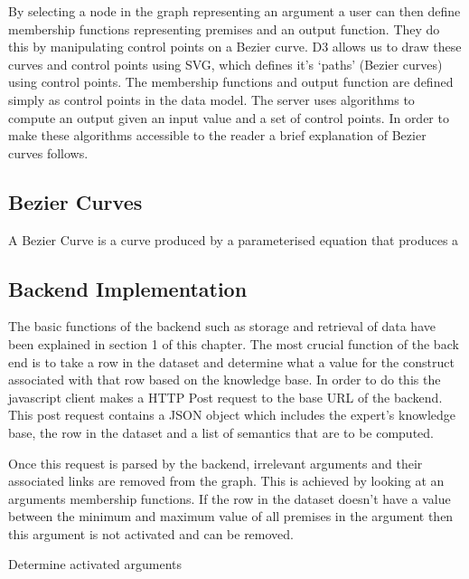 By selecting a node in the graph representing an argument a user can then define membership functions representing premises and an output function. They do this by manipulating control points on a Bezier curve. D3 allows us to draw these curves and control points using SVG, which defines it's `paths' (Bezier curves) using control points. The membership functions and output function are defined simply as control points in the data model. The server uses algorithms to compute an output given an input value and a set of control points. In order to make these algorithms accessible to the reader a brief explanation of Bezier curves follows.


\subsection{Bezier Curves}

A Bezier Curve is a curve produced by a parameterised equation that produces a 

\subsection{Backend Implementation}

The basic functions of the backend such as storage and retrieval of data have been explained in section 1 of this chapter. The most crucial function of the back end is to take a row in the dataset and determine what a value for the construct associated with that row based on the knowledge base. In order to do this the javascript client makes a HTTP Post request to the base URL of the backend. This post request contains a JSON object which includes the expert's knowledge base, the row in the dataset and a list of semantics that are to be computed.

Once this request is parsed by the backend, irrelevant arguments and their associated links are removed from the graph. This is achieved by looking at an arguments membership functions. If the row in the dataset doesn't have a value between the minimum and maximum value of all premises in the argument then this argument is not activated and can be removed.

\begin{algorithm}
\caption{Determine activated arguments}
\begin{algorithmic} 
\ENDFOR
\end{algorithmic}
\end{algorithm}

